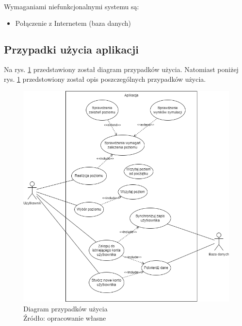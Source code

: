 \documentclass[12pt,a4paper]{article} %
\begin{document}
Wymaganiami niefunkcjonalnymi systemu są:
\begin{itemize}[nosep]
	\item Połączenie z Internetem (baza danych)
\end{itemize}

\subsection{Przypadki użycia aplikacji}
Na rys. \ref{rys:diagram-przypadków-użycia}  przedstawiony został diagram przypadków użycia. Natomiast poniżej rys. \ref{rys:diagram-przypadków-użycia} przedstowiony został opis poszczególnych przypadków użycia.

\begin{figure}[h]
	\centering
	\includegraphics[width=15cm]{images/use_case_diagram.png}
	\caption{Diagram przypadków użycia \\ Źródło: opracowanie własne}
	\label{rys:diagram-przypadków-użycia} %
\end{figure}
\end{document}
